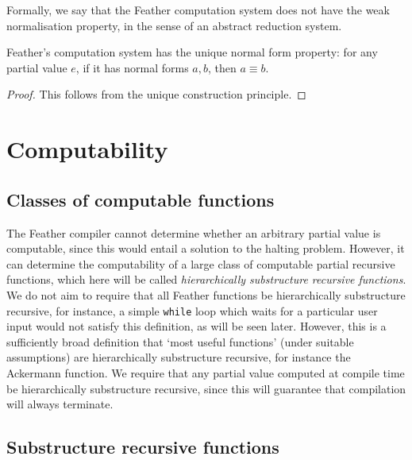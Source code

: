 \documentclass[11pt]{book}
\begin{document}
Formally, we say that the Feather computation system does not have the weak normalisation property, in the sense of an abstract reduction system.
\begin{lem}
  Feather's computation system has the unique normal form property: for any partial value \( e \), if it has normal forms \( a, b \), then \( a \equiv b \).
\end{lem}
\begin{proof}
  This follows from the unique construction principle.
\end{proof}

\section{Computability}

\subsection{Classes of computable functions}

The Feather compiler cannot determine whether an arbitrary partial value is computable, since this would entail a solution to the halting problem.
However, it can determine the computability of a large class of computable partial recursive functions, which here will be called \textit{hierarchically substructure recursive functions}.
We do not aim to require that all Feather functions be hierarchically substructure recursive, for instance, a simple \lstinline{while} loop which waits for a particular user input would not satisfy this definition, as will be seen later.
However, this is a sufficiently broad definition that `most useful functions' (under suitable assumptions) are hierarchically substructure recursive, for instance the Ackermann function.
We require that any partial value computed at compile time be hierarchically substructure recursive, since this will guarantee that compilation will always terminate.

\subsection{Substructure recursive functions}
\end{document}
